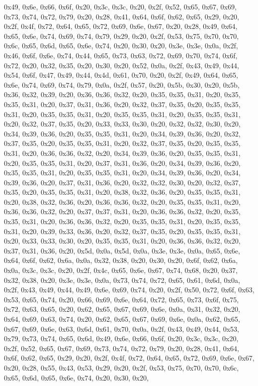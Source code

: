 \documentclass[
]{book}
\begin{document}
0x49, 0x6e, 0x66, 0x6f, 0x20, 0x3c, 0x3c, 0x20, 0x2f, 0x52, 0x65, 0x67, 0x69, 0x73, 0x74, 0x72, 0x79, 0x20, 0x28, 0x41, 0x64, 0x6f, 0x62, 0x65, 0x29, 0x20, 0x2f, 0x4f, 0x72, 0x64, 0x65, 0x72, 0x69, 0x6e, 0x67, 0x20, 0x28, 0x49, 0x64, 0x65, 0x6e, 0x74, 0x69, 0x74, 0x79, 0x29, 0x20, 0x2f, 0x53, 0x75, 0x70, 0x70, 0x6c, 0x65, 0x6d, 0x65, 0x6e, 0x74, 0x20, 0x30, 0x20, 0x3e, 0x3e, 0x0a, 0x2f, 0x46, 0x6f, 0x6e, 0x74, 0x44, 0x65, 0x73, 0x63, 0x72, 0x69, 0x70, 0x74, 0x6f, 0x72, 0x20, 0x32, 0x35, 0x20, 0x30,
0x20, 0x52, 0x0a, 0x2f, 0x43, 0x49, 0x44, 0x54, 0x6f, 0x47, 0x49, 0x44, 0x4d, 0x61, 0x70, 0x20, 0x2f, 0x49, 0x64, 0x65, 0x6e, 0x74, 0x69, 0x74, 0x79, 0x0a, 0x2f, 0x57, 0x20, 0x5b, 0x30, 0x20, 0x5b, 0x36, 0x32, 0x39, 0x20, 0x36, 0x36, 0x32, 0x20, 0x35, 0x35, 0x31, 0x20, 0x35, 0x35, 0x31, 0x20, 0x37, 0x31, 0x36, 0x20, 0x32, 0x37, 0x35, 0x20, 0x35, 0x35, 0x31, 0x20, 0x35, 0x35, 0x31, 0x20, 0x35, 0x35, 0x31, 0x20, 0x35, 0x35, 0x31, 0x20, 0x32, 0x37, 0x35, 0x20, 0x33, 0x33, 0x30, 0x20, 0x32, 0x32, 0x30,
0x20, 0x34, 0x39, 0x36, 0x20, 0x35, 0x35, 0x31, 0x20, 0x34, 0x39, 0x36, 0x20, 0x32, 0x37, 0x35, 0x20, 0x35, 0x35, 0x31, 0x20, 0x32, 0x37, 0x35, 0x20, 0x35, 0x35, 0x31, 0x20, 0x36, 0x36, 0x32, 0x20, 0x34, 0x39, 0x36, 0x20, 0x35, 0x35, 0x31, 0x20, 0x35, 0x35, 0x31, 0x20, 0x37, 0x31, 0x36, 0x20, 0x34, 0x39, 0x36, 0x20, 0x35, 0x35, 0x31, 0x20, 0x35, 0x35, 0x31, 0x20, 0x34, 0x39, 0x36, 0x20, 0x34, 0x39, 0x36, 0x20, 0x37, 0x31, 0x36, 0x20, 0x32, 0x32, 0x30, 0x20, 0x32, 0x37, 0x35, 0x20, 0x35, 0x35, 0x31,
0x20, 0x38, 0x32, 0x36, 0x20, 0x35, 0x35, 0x31, 0x20, 0x38, 0x32, 0x36, 0x20, 0x36, 0x36, 0x32, 0x20, 0x35, 0x35, 0x31, 0x20, 0x36, 0x36, 0x32, 0x20, 0x37, 0x37, 0x31, 0x20, 0x36, 0x36, 0x32, 0x20, 0x35, 0x35, 0x31, 0x20, 0x36, 0x36, 0x32, 0x20, 0x35, 0x35, 0x31, 0x20, 0x35, 0x35, 0x31, 0x20, 0x39, 0x33, 0x36, 0x20, 0x32, 0x37, 0x35, 0x20, 0x35, 0x35, 0x31, 0x20, 0x33, 0x33, 0x30, 0x20, 0x35, 0x35, 0x31, 0x20, 0x36, 0x36, 0x32, 0x20, 0x37, 0x31, 0x36, 0x20, 0x5d, 0x0a, 0x5d, 0x0a, 0x3e, 0x3e, 0x0a,
0x65, 0x6e, 0x64, 0x6f, 0x62, 0x6a, 0x0a, 0x32, 0x38, 0x20, 0x30, 0x20, 0x6f, 0x62, 0x6a, 0x0a, 0x3c, 0x3c, 0x20, 0x2f, 0x4c, 0x65, 0x6e, 0x67, 0x74, 0x68, 0x20, 0x37, 0x32, 0x38, 0x20, 0x3e, 0x3e, 0x0a, 0x73, 0x74, 0x72, 0x65, 0x61, 0x6d, 0x0a, 0x2f, 0x43, 0x49, 0x44, 0x49, 0x6e, 0x69, 0x74, 0x20, 0x2f, 0x50, 0x72, 0x6f, 0x63, 0x53, 0x65, 0x74, 0x20, 0x66, 0x69, 0x6e, 0x64, 0x72, 0x65, 0x73, 0x6f, 0x75, 0x72, 0x63, 0x65, 0x20, 0x62, 0x65, 0x67, 0x69, 0x6e, 0x0a, 0x31, 0x32, 0x20, 0x64, 0x69, 0x63,
0x74, 0x20, 0x62, 0x65, 0x67, 0x69, 0x6e, 0x0a, 0x62, 0x65, 0x67, 0x69, 0x6e, 0x63, 0x6d, 0x61, 0x70, 0x0a, 0x2f, 0x43, 0x49, 0x44, 0x53, 0x79, 0x73, 0x74, 0x65, 0x6d, 0x49, 0x6e, 0x66, 0x6f, 0x20, 0x3c, 0x3c, 0x20, 0x2f, 0x52, 0x65, 0x67, 0x69, 0x73, 0x74, 0x72, 0x79, 0x20, 0x28, 0x41, 0x64, 0x6f, 0x62, 0x65, 0x29, 0x20, 0x2f, 0x4f, 0x72, 0x64, 0x65, 0x72, 0x69, 0x6e, 0x67, 0x20, 0x28, 0x55, 0x43, 0x53, 0x29, 0x20, 0x2f, 0x53, 0x75, 0x70, 0x70, 0x6c, 0x65, 0x6d, 0x65, 0x6e, 0x74, 0x20, 0x30, 0x20,
\end{document}
